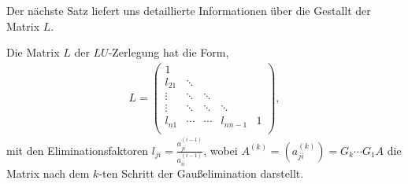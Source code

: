 Der nächste Satz liefert uns detaillierte Informationen über die Gestallt der
Matrix $L$.
\begin{prop}
\label{prop:2.1}
Die Matrix $L$ der $LU$-Zerlegung hat die Form,
\begin{align*}
L = \begin{pmatrix}
1 & & & &  \\
 l_{21}& \ddots &  & &  \\
 \vdots & \ddots& \ddots & &  \\
 \vdots & \ddots &  \ddots & \ddots &  \\
 l_{n1} & \cdots & \cdots & l_{nn-1} &  1\\
\end{pmatrix},
\end{align*}
mit den Eliminationsfaktoren $l_{ji} = \frac{a_{ji}^{(i-1)}}{a_{ii}^{(i-1)}}$,
 wobei $A^{(k)} = (a_{ji}^{(k)}) = G_k \cdots G_1 A$ die Matrix nach dem $k$-ten
 Schritt der Gaußelimination darstellt.\fishhere
\end{prop}
